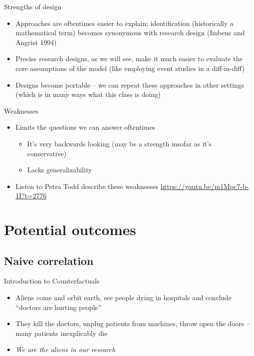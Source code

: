 \documentclass{beamer}
\begin{document}
\begin{frame}{Strengths of design}

\begin{itemize}
\item Approaches are oftentimes easier to explain; identification (historically a mathematical term) becomes synonymous with research design (Imbens and Angrist 1994)
\item Precise research designs, as we will see, make it much easier to evaluate the core assumptions of the model (like employing event studies in a diff-in-diff)
\item Designs become portable -- we can repeat these approaches in other settings (which is in many ways what this class is doing)
\end{itemize}

\end{frame}

\begin{frame}{Weaknesses}

\begin{itemize}
\item Limits the questions we can answer oftentimes 
	\begin{itemize}
	\item It's very backwards looking (may be a strength insofar as it's conservative)
	\item Lacks generalizability
	\end{itemize}
\item Listen to Petra Todd describe these weaknesses \url{https://youtu.be/m1Mpc7-b-1I?t=2776}

\end{itemize}

\end{frame}


\section{Potential outcomes}

\subsection{Naive correlation}

\begin{frame}{Introduction to Counterfactuals}

  \begin{itemize}
    \item Aliens come and orbit earth, see people dying in hospitals and conclude ``doctors are hurting people''
    \item They kill the doctors, unplug patients from machines, throw open the doors -- many patients inexplicably die
    \item \emph{We are the aliens in our research}
  \end{itemize}

\end{frame}
\end{document}
